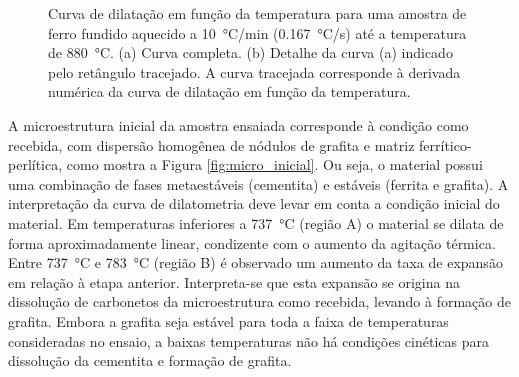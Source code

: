 \begin{figure}
  \quad
  \caption{Curva de dilatação em função da temperatura para uma amostra de ferro fundido aquecido a \SI{10}{\degreeCelsius/min} (\SI{0.167}{\degreeCelsius/s}) até a temperatura de \SI{880}{\degreeCelsius}. (a) Curva completa. (b) Detalhe da curva (a) indicado pelo retângulo tracejado. A curva tracejada corresponde à derivada numérica da curva de dilatação em função da temperatura.}
  \label{fig:dil_tempera}
\end{figure}

A microestrutura inicial da amostra ensaiada corresponde à condição como recebida, com dispersão homogênea de nódulos de grafita e matriz ferrítico-perlítica, como mostra a Figura \ref{fig:micro_inicial}. 
Ou seja, o material possui uma combinação de fases metaestáveis (cementita) e estáveis (ferrita e grafita). A interpretação da curva de dilatometria deve levar em conta a condição inicial do material. 
Em temperaturas inferiores a \SI{737}{\degreeCelsius} (região A) o material se dilata de forma aproximadamente linear, condizente com o aumento da agitação térmica. Entre \SI{737}{\degreeCelsius} e \SI{783}{\degreeCelsius} (região B) é observado um aumento da taxa de expansão em relação à etapa anterior. Interpreta-se que esta expansão se origina na dissolução de carbonetos da microestrutura como recebida, levando à formação de grafita. Embora a grafita seja estável para toda a faixa de temperaturas consideradas no ensaio, a baixas temperaturas não há condições cinéticas para dissolução da cementita e formação de grafita.

